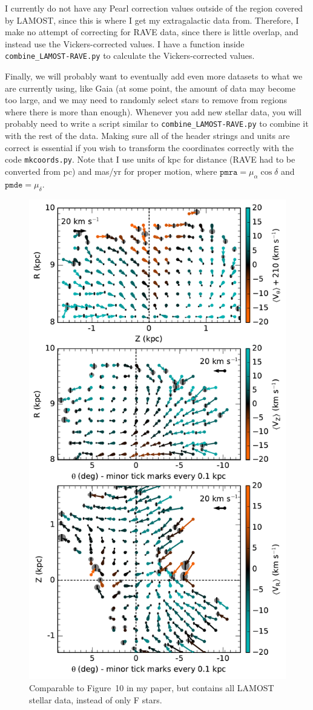 \documentclass{article}
\begin{document}
I currently do not have any Pearl correction values outside of the region covered by LAMOST, since this is where I get my extragalactic data from. Therefore, I make no attempt of correcting for RAVE data, since there is little overlap, and instead use the Vickers-corrected values. I have a function inside \texttt{combine\_LAMOST-RAVE.py} to calculate the Vickers-corrected values.

Finally, we will probably want to eventually add even more datasets to what we are currently using, like Gaia (at some point, the amount of data may become too large, and we may need to randomly select stars to remove from regions where there is more than enough). Whenever you add new stellar data, you will probably need to write a script similar to \texttt{combine\_LAMOST-RAVE.py} to combine it with the rest of the data. Making sure all of the header strings and units are correct is essential if you wish to transform the coordinates correctly with the code \texttt{mkcoords.py}. Note that I use units of kpc for distance (RAVE had to be converted from pc) and mas/yr for proper motion, where $\texttt{pmra} = \mu_\alpha \cos{\delta}$ and $\texttt{pmde} = \mu_\delta$.

\begin{figure}
\centering
\includegraphics[width=.7\textwidth]{sideviewL.pdf}
\caption{
	Comparable to Figure~10 in my paper, but contains all LAMOST stellar data, instead of only F stars. 
	\label{fig:sideviewL}
}
\end{figure}
\end{document}
